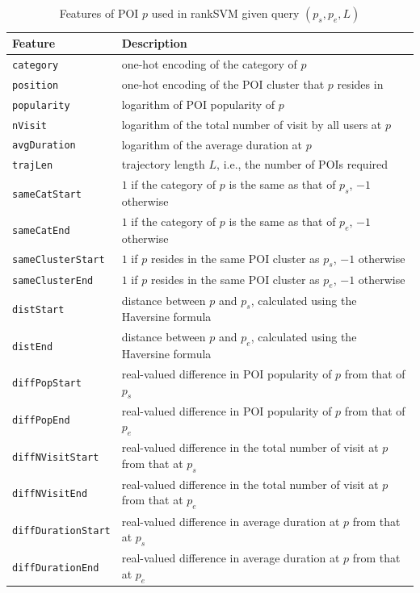\begin{table}[t]
\caption{Features of POI $p$ used in rankSVM given query $(p_s, p_e, L)$}
\label{tab:featurerank}
\centering
\begin{tabular}{l|l} \hline
\textbf{Feature}  & \textbf{Description} \\ \hline
\texttt{category}          & one-hot encoding of the category of $p$ \\
\texttt{position}          & one-hot encoding of the POI cluster that $p$ resides in \\
\texttt{popularity}        & logarithm of POI popularity of $p$ \\
\texttt{nVisit}            & logarithm of the total number of visit by all users at $p$ \\
\texttt{avgDuration}       & logarithm of the average duration at $p$ \\ \hline
\texttt{trajLen}           & trajectory length $L$, i.e., the number of POIs required \\
\texttt{sameCatStart}      & $1$ if the category of $p$ is the same as that of $p_s$, $-1$ otherwise \\
\texttt{sameCatEnd}        & $1$ if the category of $p$ is the same as that of $p_e$, $-1$ otherwise \\
\texttt{sameClusterStart}  & $1$ if $p$ resides in the same POI cluster as $p_s$, $-1$ otherwise \\
\texttt{sameClusterEnd}    & $1$ if $p$ resides in the same POI cluster as $p_e$, $-1$ otherwise \\
\texttt{distStart}         & distance between $p$ and $p_s$, calculated using the Haversine formula \\
\texttt{distEnd}           & distance between $p$ and $p_e$, calculated using the Haversine formula \\
\texttt{diffPopStart}      & real-valued difference in POI popularity of $p$ from that of $p_s$ \\
\texttt{diffPopEnd}        & real-valued difference in POI popularity of $p$ from that of $p_e$ \\
\texttt{diffNVisitStart}   & real-valued difference in the total number of visit at $p$ from that at $p_s$ \\
\texttt{diffNVisitEnd}     & real-valued difference in the total number of visit at $p$ from that at $p_e$ \\
\texttt{diffDurationStart} & real-valued difference in average duration at $p$ from that at $p_s$ \\
\texttt{diffDurationEnd}   & real-valued difference in average duration at $p$ from that at $p_e$ \\ \hline
\end{tabular}
\end{table}
